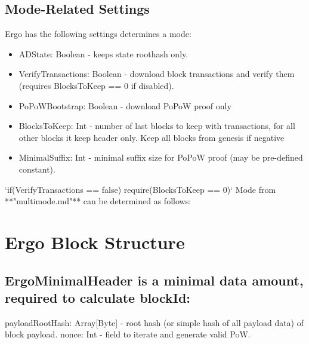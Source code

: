 \documentclass[]{article}   %
\begin{document}
\subsection{Mode-Related Settings}
Ergo has the following settings determines a mode:
\begin{itemize}
\item ADState: Boolean - keeps state roothash only.
\item VerifyTransactions: Boolean - download block transactions and verify them (requires BlocksToKeep == 0 if disabled).
\item PoPoWBootstrap: Boolean - download PoPoW proof only
\item BlocksToKeep: Int - number of last blocks to keep with transactions, for all other blocks it keep header
only. Keep all blocks from genesis if negative
\item MinimalSuffix: Int - minimal suffix size for PoPoW proof (may be pre-defined constant).
\end{itemize}
\par 
‘if(VerifyTransactions == false) require(BlocksToKeep == 0)‘ Mode from **"multimode.md"** can be determined as follows:

\section{Ergo Block Structure}
\subsection{ErgoMinimalHeader is a minimal data amount, required to calculate blockId:}
payloadRootHash: Array[Byte] - root hash (or simple hash of all payload data) of block payload.
nonce: Int - field to iterate and generate valid PoW.
\end{document}

